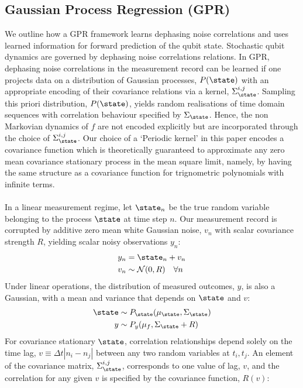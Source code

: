 \subsection{Gaussian Process Regression (GPR)}

We outline how a GPR framework learns dephasing noise correlations and uses learned information for forward prediction of the qubit state. Stochastic qubit dynamics are governed by dephasing noise correlations relations. In GPR, dephasing noise correlations in the measurement record can be learned if one projects data on a distribution of Gaussian processes, $P(\state)$ with an appropriate encoding of their covariance relations via a kernel, $\Sigma_\state^{i,j}$. Sampling this priori distribution, $P(\state)$, yields random realisations of time domain sequences with correlation behaviour specified by $\Sigma_\state$. Hence, the non Markovian dynamics of $f$ are not encoded explicitly but are incorporated through the choice of $\Sigma_\state^{i,j}$. Our choice of a `Periodic kernel' in this paper encodes a covariance function which is theoretically guaranteed to approximate any zero mean covariance stationary process in the mean square limit, namely, by having the same structure as a covariance function for trignometric polynomials with infinite terms.
\\
\\
In a linear measurement regime, let $\state_n$ be the true random variable belonging to the process $\state$ at time step $n$. Our measurement record is corrupted by additive zero mean white Gaussian noise, $v_n$ with scalar covariance strength $R$, yielding scalar noisy observations $y_n$:
\begin{align}
y_n &= \state_n + v_n \\
v_n & \sim \mathcal{N}(0, R) \quad \forall n
\end{align}
Under linear operations, the distribution of measured outcomes, $y$, is also a Gaussian, with a  mean and variance that depends on $\state$ and $v$: 
\begin{align}
\state & \sim P_\state(\mu_\state,\Sigma_\state ) \\
y & \sim P_y(\mu_f,\Sigma_\state + R ) 
\end{align}
For covariance stationary $\state$, correlation relationships depend solely on the time lag, $v \equiv \Delta t|n_i - n_j|$ between any two random variables at $t_i, t_j$.  An element of the covariance matrix, $\Sigma_\state^{i,j}$, corresponds to one value of lag, $v$, and the correlation for any given $v$  is specified by the covariance function, $R(v)$:
